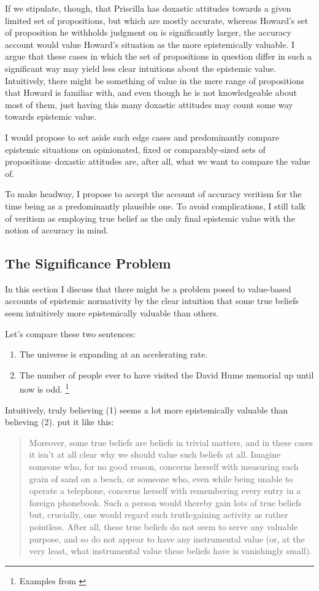 \documentclass[12pt,numbers=noenddot]{scrartcl}
\begin{document}
If we stipulate, though, that Priscilla has doxastic attitudes towards a given limited set of propositions, but which are mostly accurate, whereas Howard's set of proposition he withholds judgment on is significantly larger, the accuracy account would value Howard's situation as the more epistemically valuable. I argue that these cases in which the set of propositions in question differ in such a significant way may yield less clear intuitions about the epistemic value. Intuitively, there might be something of value in the mere range of propositions that Howard is familiar with, and even though he is not knowledgeable about most of them, just having this many doxastic attitudes may count some way towards epistemic value.

I would propose to set aside such edge cases and predominantly compare epistemic situations on opinionated, fixed or comparably-sized sets of propositions–doxastic attitudes are, after all, what we want to compare the value of.

To make headway, I propose to accept the account of accuracy veritism for the time being as a predominantly plausible one. To avoid complications, I still talk of veritism as employing true belief as the only final epistemic value with the notion of accuracy in mind.

\subsection{The Significance Problem}

In this section I discuss that there might be a problem posed to value-based accounts of epistemic normativity by the clear intuition that some true beliefs seem intuitively more epistemically valuable than others.

Let's compare these two sentences:
\begin{enumerate}
    \item The universe is expanding at an accelerating rate.
    \item The number of people ever to have visited the David Hume memorial up until now is odd. \footnote{Examples from \textcite{Ahlstrom-Vij2013}}
\end{enumerate}

Intuitively, truly believing (1) seems a lot more epistemically valuable than believing (2). \textcite{sep-knowledge-value} put it like this:

\begin{quote}
    Moreover, some true beliefs are beliefs in trivial matters, and in these cases it isn't at all clear why we should value such beliefs at all. Imagine someone who, for no good reason, concerns herself with measuring each grain of sand on a beach, or someone who, even while being unable to operate a telephone, concerns herself with remembering every entry in a foreign phonebook. Such a person would thereby gain lots of true beliefs but, crucially, one would regard such truth-gaining activity as rather pointless. After all, these true beliefs do not seem to serve any valuable purpose, and so do not appear to have any instrumental value (or, at the very least, what instrumental value these beliefs have is vanishingly small).
\end{quote}
\end{document}

